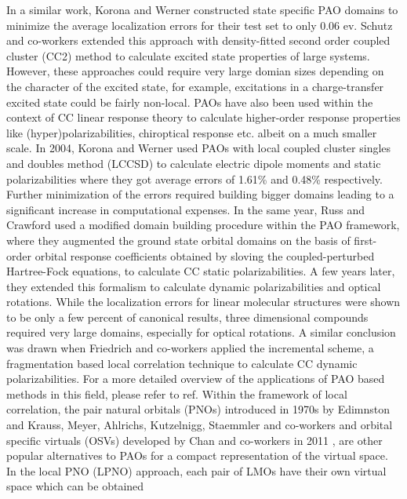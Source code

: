 In a similar work, Korona and Werner\cite{Korona04} constructed state specific PAO domains to minimize the average 
localization errors for their test set to only 0.06 ev. Schutz and co-workers extended this approach with 
density-fitted second order coupled cluster (CC2) \cite{Christiansen95:CC2} method to calculate excited state properties of 
large systems.\cite{Schutz03} However, these approaches could require very large domian sizes depending on the 
character of the excited state, for example, excitations in a charge-transfer excited state could be 
fairly non-local. PAOs have also been used within the context of CC linear response theory to calculate 
higher-order response properties like (hyper)polarizabilities, chiroptical response etc. albeit on a 
much smaller scale. In 2004, Korona and Werner\cite{Korona04} used PAOs with local coupled cluster singles 
and doubles method (LCCSD) to calculate electric dipole moments and static polarizabilities where they got 
average errors of 1.61\% and 0.48\% respectively. Further minimization of the errors required building bigger 
domains leading to a significant increase in computational expenses. In the same year, Russ and Crawford\cite{Russ04} 
used a modified domain building procedure within the PAO framework, where they augmented the ground state 
orbital domains on the basis of first-order orbital response coefficients obtained by sloving the coupled-perturbed 
Hartree-Fock equations, to calculate CC static polarizabilities. A few years later, they extended this 
formalism to calculate dynamic polarizabilities and optical rotations\cite{Russ08}. While the localization errors 
for linear molecular structures were shown to be only a few percent of canonical results, three dimensional 
compounds required very large domains, especially for optical rotations. A similar conclusion was drawn 
when Friedrich and co-workers applied the incremental scheme, a fragmentation based local correlation technique 
to calculate CC dynamic polarizabilities.\cite{Friedrich15} For a more detailed overview of the applications of PAO based 
methods in this field, please refer to ref\cite{McAlexander15:LRCC}. Within the framework of local correlation, 
the pair natural orbitals (PNOs) introduced in 1970s by Edimnston and Krauss\cite{Edmiston66}, Meyer\cite{Meyer73}, Ahlrichs, 
Kutzelnigg, Staemmler and co-workers\cite{Ahlrichs75} and orbital specific virtuals (OSVs) developed by Chan and 
co-workers in 2011 \cite{Yang12}, are other popular alternatives to PAOs for a compact representation of the virtual 
space. In the local PNO (LPNO) approach, each pair of LMOs have their own virtual space which can be obtained 
